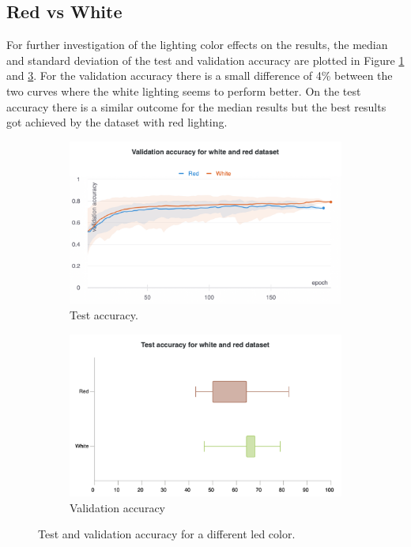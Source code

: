 \subsection{Red vs White}
	 For further investigation of the lighting color effects on the results, the median and standard deviation of the test and validation accuracy are plotted in Figure \ref{ref:res:sd:ta:rw} and \ref{fig:res:sd:va:rw}. For the validation accuracy there is a small difference of 4\% between the two curves where the white lighting seems to perform better. On the test accuracy there is a similar outcome for the median results but the best results got achieved by the dataset with red lighting. 

	\begin{figure}[hbtp]
		\begin{subfigure}{0.49\textwidth}
		\centering
		\includegraphics[width=\linewidth]{fig/results/wandb/spaghetti_dataset/charts/Section-16-Panel-0-gkiaebqxq}
		\caption{Test accuracy.}
		\label{ref:res:sd:ta:rw}
		\end{subfigure}
		\hspace*{\fill}
		\begin{subfigure}{0.49\textwidth}
		\centering
		\includegraphics[width=\linewidth]{fig/results/wandb/spaghetti_dataset/charts/Section-16-Panel-1-lgbosq568}
		\caption{Validation accuracy}
		\label{fig:res:sd:va:rw}
		\end{subfigure}
		\caption{Test and validation accuracy for a different led color.}
	\end{figure}
	

